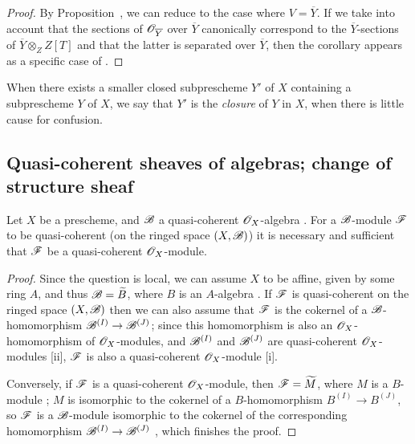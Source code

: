 \begin{proof}
By Proposition~, we can reduce to the case where $V=\overline{Y}$.
If we take into account that the sections of $\mathscr{O}_{\overline{Y}}$ over $\overline{Y}$ canonically correspond to the $\overline{Y}$-sections of $\overline{Y}\otimes_Z Z[T]$  and that the latter is separated over $\overline{Y}$, then the corollary appears as a specific case of .
\end{proof}

When there exists a smaller closed subprescheme $Y'$ of $X$ containing a subprescheme $Y$ of $X$, we say that $Y'$ is the \emph{closure} of $Y$ in $X$, when there is little cause for confusion.

\subsection{Quasi-coherent sheaves of algebras; change of structure sheaf}
\label{subsection:I.9.6}

\begin{proposition}[9.6.1]
\label{I.9.6.1}
Let $X$ be a prescheme, and $\mathscr{B}$ a quasi-coherent $\mathscr{O}_X$-algebra .
For a $\mathscr{B}$-module $\mathscr{F}$ to be quasi-coherent (on the ringed space $(X,\mathscr{B})$) it is necessary and sufficient that $\mathscr{F}$ be a quasi-coherent $\mathscr{O}_X$-module.
\end{proposition}

\begin{proof}
Since the question is local, we can assume $X$ to be affine, given by some ring $A$, and thus $\mathscr{B}=\widetilde{B}$, where $B$ is an $A$-algebra .
If $\mathscr{F}$ is quasi-coherent on the ringed space $(X,\mathscr{B})$ then we can also assume that $\mathscr{F}$ is the cokernel of a $\mathscr{B}$-homomorphism $\sh{B}^{(I)}\to\sh{B}^{(J)}$; since this homomorphism is also an $\mathscr{O}_X$-homomorphism of $\mathscr{O}_X$-modules, and $\mathscr{B}^{(I)}$ and $\mathscr{B}^{(J)}$ are quasi-coherent $\mathscr{O}_X$-modules [ii], $\mathscr{F}$ is also a quasi-coherent $\mathscr{O}_X$-module [i].

Conversely, if $\mathscr{F}$ is a quasi-coherent $\mathscr{O}_X$-module, then $\mathscr{F}=\widetilde{M}$, where $M$ is a $B$-module ; $M$ is isomorphic to the cokernel of a $B$-homomorphism $B^{(I)}\to B^{(J)}$, so $\mathscr{F}$ is a $\mathscr{B}$-module isomorphic to the cokernel of the corresponding homomorphism $\sh{B}^{(I)}\to\sh{B}^{(J)}$ , which finishes the proof.
\end{proof}

